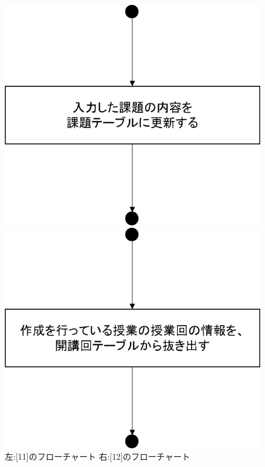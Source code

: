 \begin{figure}[htbp]
 \begin{minipage}{0.5\hsize}
  \begin{center}
   \includegraphics[width=0.45\linewidth,clip]{./img/takeover_lecture/sub11.png}
  \end{center}
 \end{minipage}
 \begin{minipage}{0.5\hsize}
  \begin{center}
   \includegraphics[width=0.45\linewidth,clip]{./img/takeover_lecture/sub12.png}
  \end{center}
 \end{minipage}
 \caption{左:[11]のフローチャート 右:[12]のフローチャート}\label{fig:takeoverlectureflow5}
\end{figure}

